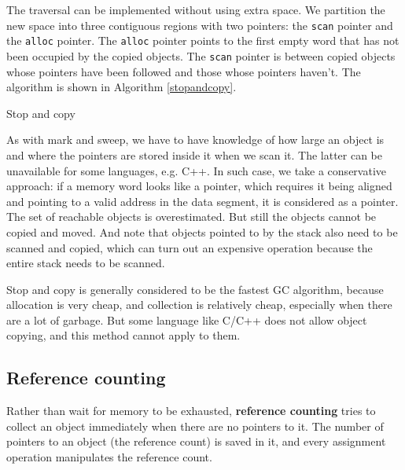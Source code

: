The traversal can be implemented without using extra space. We partition the new space into three contiguous regions with two pointers: the \texttt{scan} pointer and the \texttt{alloc} pointer. The \texttt{alloc} pointer points to the first empty word that has not been occupied by the copied objects. The \texttt{scan} pointer is between copied objects whose pointers have been followed and those whose pointers haven't. The algorithm is shown in Algorithm \ref{stopandcopy}.
\begin{algorithm}
\caption{Stop and copy}\label{stopandcopy}
\begin{algorithmic}
\Else
{}
\EndIf
\EndFor
{}
\EndWhile
\end{algorithmic} 
\end{algorithm} 
As with mark and sweep, we have to have knowledge of how large an object is and where the pointers are stored inside it when we scan it. The latter can be unavailable for some languages, e.g. C++. In such case, we take a conservative approach: if a memory word looks like a pointer, which requires it being aligned and pointing to a valid address in the data segment, it is considered as a pointer. The set of reachable objects is overestimated. But still the objects cannot be copied and moved. And note that objects pointed to by the stack also need to be scanned and copied, which can turn out an expensive operation because the entire stack needs to be scanned.

Stop and copy is generally considered to be the fastest GC algorithm, because allocation is very cheap, and collection is relatively cheap, especially when there are a lot of garbage. But some language like C/C++ does not allow object copying, and this method cannot apply to them.
\subsection{Reference counting}
Rather than wait for memory to be exhausted, \textbf{reference counting} tries to collect an object immediately when there are no pointers to it. The number of pointers to an object (the reference count) is saved in it, and every assignment operation manipulates the reference count. 

